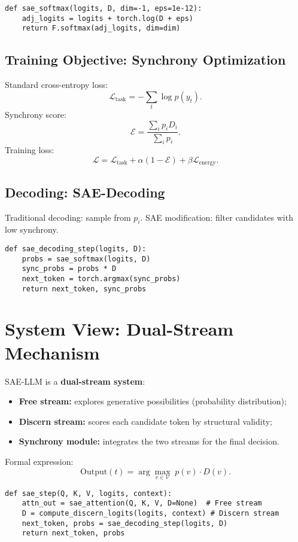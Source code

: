 \documentclass[11pt]{article}
\theoremstyle{plain}
\theoremstyle{definition}
\theoremstyle{remark}
\begin{document}
\begin{verbatim}
def sae_softmax(logits, D, dim=-1, eps=1e-12):
    adj_logits = logits + torch.log(D + eps)
    return F.softmax(adj_logits, dim=dim)
\end{verbatim}

\subsection{Training Objective: Synchrony Optimization}
Standard cross-entropy loss:
\[
\mathcal{L}_{\text{task}} = -\sum_t \log p(y_t).
\]
Synchrony score:
\[
\mathcal{E} = \frac{\sum_i p_i D_i}{\sum_i p_i}.
\]
Training loss:
\[
\mathcal{L} = \mathcal{L}_{\text{task}} + \alpha (1-\mathcal{E}) + \beta \mathcal{L}_{\text{energy}}.
\]

\subsection{Decoding: SAE-Decoding}
Traditional decoding: sample from $p_i$. SAE modification: filter candidates with low synchrony.
\begin{verbatim}
def sae_decoding_step(logits, D):
    probs = sae_softmax(logits, D)
    sync_probs = probs * D
    next_token = torch.argmax(sync_probs)
    return next_token, sync_probs
\end{verbatim}

\section{System View: Dual-Stream Mechanism}

SAE-LLM is a \textbf{dual-stream system}:
\begin{itemize}
  \item \textbf{Free stream:} explores generative possibilities (probability distribution);
  \item \textbf{Discern stream:} scores each candidate token by structural validity;
  \item \textbf{Synchrony module:} integrates the two streams for the final decision.
\end{itemize}

Formal expression:
\[
\text{Output}(t) = \arg\max_{v \in \mathcal{V}} \; p(v) \cdot D(v).
\]

\begin{verbatim}
def sae_step(Q, K, V, logits, context):
    attn_out = sae_attention(Q, K, V, D=None)  # Free stream
    D = compute_discern_logits(logits, context) # Discern stream
    next_token, probs = sae_decoding_step(logits, D)
    return next_token, probs
\end{verbatim}
\end{document}
